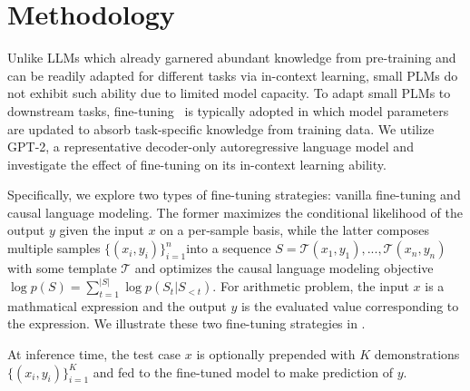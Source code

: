 \section{Methodology}
\label{sec:method}
Unlike LLMs which already garnered abundant knowledge from pre-training and can be readily adapted for different tasks via in-context learning, small PLMs 
do not exhibit such ability due to limited model capacity. To adapt small PLMs to downstream tasks, fine-tuning~\cite{elmo,bert} is typically adopted in which model parameters are updated to absorb task-specific knowledge from 
training data. We utilize GPT-2, a representative decoder-only autoregressive language model and investigate the effect of fine-tuning on its in-context learning ability.

Specifically, we explore two types of fine-tuning strategies: vanilla fine-tuning and causal language modeling. The former maximizes the conditional likelihood of the output $y$ given the input $x$ on a per-sample 
basis, while the latter composes multiple samples $\{(x_i, y_i)\}_{i=1}^{n}$into a sequence $S=\mathcal{T}(x_1,y_1),..., \mathcal{T}(x_n, y_n)$ with some template $\mathcal{T}$ and optimizes the causal language modeling objective $\log{p(S)}=\sum_{t=1}^{|S|}\log{p(S_t|S_{<t})}$. For arithmetic problem, the input $x$ is a mathmatical expression and the output $y$ is the evaluated value corresponding to the expression. We illustrate these two fine-tuning strategies in .

At inference time, the test case $x$ is optionally prepended with $K$ demonstrations $\{(x_i,y_i)\}_{i=1}^K$ and fed to the fine-tuned model to make prediction of $y$.


